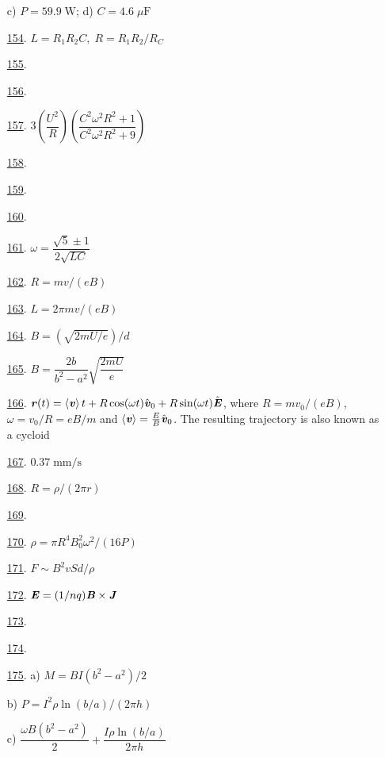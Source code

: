 \begin{multicols}{2}
\begin{enumerate}
	c) $P=59.9\;\text{W}$; d) $C=4.6\;\mu\text{F}$ %
	\item [\hyperlink{P154}{154}.] $L=R_1R_2C,\;R=R_1R_2/R_C$ %
	\item [\hyperlink{P155}{155}.]  %
	\item [\hyperlink{P156}{156}.]  %
	\item [\hyperlink{P157}{157}.] $3\left(\dfrac{U^2}{R}\right)\left(\dfrac{C^2\omega^2R^2+1}{C^2\omega^2R^2+9}\right)$ %
	\item [\hyperlink{P158}{158}.]  %
	\item [\hyperlink{P159}{159}.]  %
	\item [\hyperlink{P160}{160}.]  %
	\item [\hyperlink{P161}{161}.] $\omega=\dfrac{\sqrt{5}\pm1}{2\sqrt{LC}}$ %
	\item [\hyperlink{P162}{162}.] $R=mv/(eB)$ %
	\item [\hyperlink{P163}{163}.] $L=2\pi mv/(eB)$ %
	\item [\hyperlink{P164}{164}.] $B=(\sqrt{2mU/e})/d$ %
	\item [\hyperlink{P165}{165}.] $B=\dfrac{2b}{b^2-a^2}\sqrt{\dfrac{2mU}{e}}$ %
	\item [\hyperlink{P166}{166}.] $\textbf{\textit{r}}(t)=\left<\textbf{\textit{v}}\right>t+R\cos(\omega t)\hat{\textbf{\textit{v}}}_0+R\sin(\omega t)\hat{\textbf{\textit{E}}}$, where $R=mv_0/(eB)$, $\omega=v_0/R=eB/m$ and $\left<\textbf{\textit{v}}\right>=\frac{E}{B}\hat{\textbf{\textit{v}}}_0$. The resulting trajectory is also known as a cycloid %
	\item [\hyperlink{P167}{167}.] $0.37\;\text{mm}/\text{s}$ %
	\item [\hyperlink{P168}{168}.] $R=\rho/(2\pi r)$ %
	\item [\hyperlink{P169}{169}.]  %
	\item [\hyperlink{P170}{170}.] $\rho=\pi R^4B_0^2\omega^2/(16P)$ %
	\item [\hyperlink{P171}{171}.] $F\sim B^2vSd/\rho$ %
	\item [\hyperlink{P172}{172}.] $\textbf{\textit{E}}=(1/nq)\textbf{\textit{B}}\times\textbf{\textit{J}}$ %
	\item [\hyperlink{P173}{173}.]  %
	\item [\hyperlink{P174}{174}.]  %
	\item [\hyperlink{P175}{175}.] a) $M=BI(b^2-a^2)/2$
	
	b) $P=I^2\rho\ln(b/a)/(2\pi h)$
	
	c) $\dfrac{\omega B(b^2-a^2)}{2}+\dfrac{I\rho\ln(b/a)}{2\pi h}$ %
\end{enumerate}
\end{multicols}